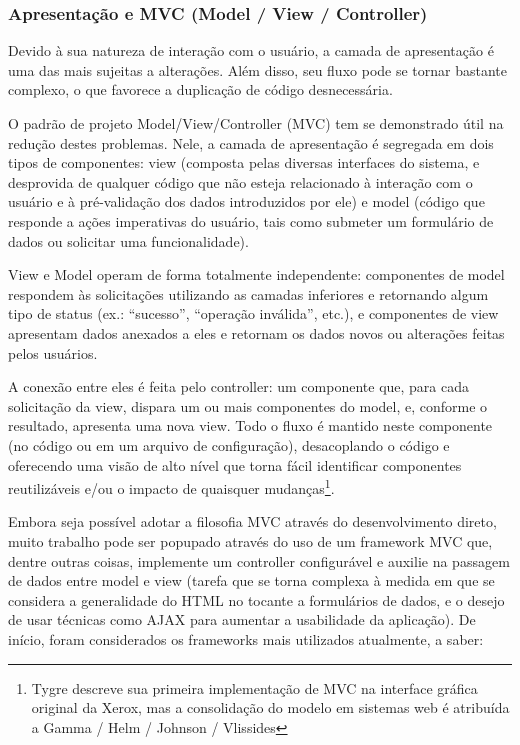 \documentclass{abnt}
\begin{document}
\subsubsection{Apresentação e MVC (Model / View / Controller)}

Devido à sua natureza de interação com o usuário, a camada de apresentação é uma das mais sujeitas a alterações. Além disso, seu fluxo pode se tornar bastante complexo, o que favorece a duplicação de código desnecessária.

O padrão de projeto Model/View/Controller (MVC) tem se demonstrado útil na redução destes problemas. Nele, a camada de apresentação é segregada em dois tipos de componentes: view (composta pelas diversas interfaces do sistema, e desprovida de qualquer código que não esteja relacionado à interação com o usuário e à pré-validação dos dados introduzidos por ele) e model (código que responde a ações imperativas do usuário, tais como submeter um formulário de dados ou solicitar uma funcionalidade).

View e Model operam de forma totalmente independente: componentes de model respondem às solicitações utilizando as camadas inferiores e retornando algum tipo de status (ex.: “sucesso”, “operação inválida”, etc.), e componentes de view apresentam dados anexados a eles e retornam os dados novos ou alterações feitas pelos usuários.

A conexão entre eles é feita pelo controller: um componente que, para cada solicitação da view, dispara um ou mais componentes do model, e, conforme o resultado, apresenta uma nova view. Todo o fluxo é mantido neste componente (no código ou em um arquivo de configuração), desacoplando o código e oferecendo uma visão de alto nível que torna fácil identificar componentes reutilizáveis e/ou o impacto de quaisquer mudanças\footnote{Tygre descreve sua primeira implementação de MVC na interface gráfica original da Xerox, mas a consolidação do modelo em sistemas web é atribuída a Gamma / Helm / Johnson / Vlissides\cite{Gamma1995}}.

Embora seja possível adotar a filosofia MVC através do desenvolvimento direto, muito trabalho pode ser popupado através do uso de um framework MVC que, dentre outras coisas, implemente um controller configurável e auxilie na passagem de dados entre model e view (tarefa que se torna complexa à medida em que se considera a generalidade do HTML no tocante a formulários de dados, e o desejo de usar técnicas como AJAX para aumentar a usabilidade da aplicação). De início, foram considerados os frameworks mais utilizados atualmente, a saber:
\end{document}
